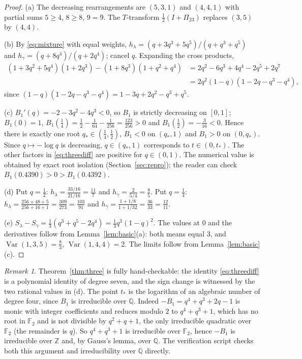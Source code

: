 \documentclass[10pt]{article}
\theoremstyle{plain}
\theoremstyle{definition}
\theoremstyle{remark}
\newtheorem{remark}[theorem]{Remark}
\DeclareMathOperator{\Var}{Var}
\begin{document}
\begin{proof}
(a) The decreasing rearrangements are $(5,3,1)$ and $(4,4,1)$ with partial sums $5\ge 4$, $8\ge 8$, $9=9$. The $T$-transform $\tfrac12(I+\Pi_{23})$ replaces $(3,5)$ by $(4,4)$.

(b) By \eqref{eq:mixture} with equal weights, $h_\lambda=(q+3q^3+5q^5)/(q+q^3+q^5)$ and $h_\gamma=(q+8q^4)/(q+2q^4)$; cancel $q$. Expanding the cross products,
\begin{align*}
(1+3q^2+5q^4)(1+2q^3)-(1+8q^3)(1+q^2+q^4)
&=2q^2-6q^3+4q^4-2q^5+2q^7\\
&=2q^2(1-q)(1-2q-q^3-q^4),
\end{align*}
since $(1-q)(1-2q-q^3-q^4)=1-3q+2q^2-q^3+q^5$.

(c) $B_1'(q)=-2-3q^2-4q^3<0$, so $B_1$ is strictly decreasing on $[0,1]$; $B_1(0)=1$, $B_1(\tfrac14)=\tfrac12-\tfrac{1}{64}-\tfrac{1}{256}=\tfrac{123}{256}>0$ and $B_1(\tfrac12)=-\tfrac{3}{16}<0$. Hence there is exactly one root $q_*\in(\tfrac14,\tfrac12)$, $B_1<0$ on $(q_*,1)$ and $B_1>0$ on $(0,q_*)$. Since $q\mapsto -\log q$ is decreasing, $q\in(q_*,1)$ corresponds to $t\in(0,t_*)$. The other factors in \eqref{eq:threediff} are positive for $q\in(0,1)$. The numerical value is obtained by exact root isolation (Section~\ref{sec:repro}); the reader can check $B_1(0.4390)>0>B_1(0.4392)$.

(d) Put $q=\tfrac12$: $h_\lambda=\tfrac{33/16}{21/16}=\tfrac{11}{7}$ and $h_\gamma=\tfrac{2}{5/4}=\tfrac85$. Put $q=\tfrac14$: $h_\lambda=\tfrac{256+48+5}{256+16+1}=\tfrac{309}{273}=\tfrac{103}{91}$ and $h_\gamma=\tfrac{1+1/8}{1+1/32}=\tfrac{36}{33}=\tfrac{12}{11}$.

(e) $S_\lambda-S_\gamma=\tfrac13(q^3+q^5-2q^4)=\tfrac13q^3(1-q)^2$. The values at $0$ and the derivatives follow from Lemma~\ref{lem:basic}(a): both means equal $3$, and $\Var(1,3,5)=\tfrac83$, $\Var(1,4,4)=2$. The limits follow from Lemma~\ref{lem:basic}(c).
\end{proof}

\begin{remark}
Theorem~\ref{thm:three} is fully hand-checkable: the identity \eqref{eq:threediff} is a polynomial identity of degree seven, and the sign change is witnessed by the two rational values in (d). The point $t_*$ is the logarithm of an algebraic number of degree four, since $B_1$ is irreducible over $\mathbb{Q}$. Indeed $-B_1=q^4+q^3+2q-1$ is monic with integer coefficients and reduces modulo $2$ to $q^4+q^3+1$, which has no root in $\mathbb{F}_2$ and is not divisible by $q^2+q+1$, the only irreducible quadratic over $\mathbb{F}_2$ (the remainder is $q$). So $q^4+q^3+1$ is irreducible over $\mathbb{F}_2$, hence $-B_1$ is irreducible over $\mathbb{Z}$ and, by Gauss's lemma, over $\mathbb{Q}$. The verification script checks both this argument and irreducibility over $\mathbb{Q}$ directly.
\end{remark}
\end{document}
